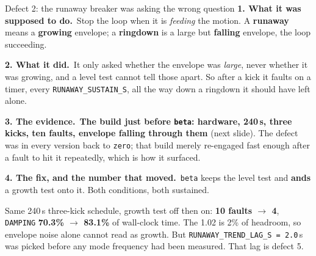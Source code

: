 \documentclass[aspectratio=169]{beamer}
\newcommand{\intended}{\textbf{1. What it was supposed to do.}}
\newcommand{\actual}{\textbf{2. What it did.}}
\newcommand{\evidence}{\textbf{3. The evidence.}}
\newcommand{\thefixn}{\textbf{4. The fix, and the number that moved.}}
\begin{document}
\begin{frame}{Defect 2: the runaway breaker was asking the wrong question}
  \footnotesize
  \intended\ Stop the loop when it is \emph{feeding} the motion. A
  \textbf{runaway} means a \textbf{growing} envelope; a \textbf{ringdown} is a
  large but \textbf{falling} envelope, the loop succeeding.

  \vspace{1mm}
  \actual\ It only asked whether the envelope was \emph{large}, never whether it
  was growing, and a level test cannot tell those apart. So after a kick it
  faults on a timer, every \texttt{RUNAWAY\_SUSTAIN\_S}, all the way down a
  ringdown it should have left alone.

  \vspace{1mm}
  \evidence\ \textbf{The build just before \texttt{beta}: hardware, 240\,s, three
  kicks, ten faults, envelope falling through them} (next slide). The defect was
  in every version back to \texttt{zero}; that build merely re-engaged fast enough
  after a fault to hit it repeatedly, which is how it surfaced.

  \vspace{1.5mm}
  \thefixn\ \texttt{beta} keeps the level test and \textbf{ands} a growth test
  onto it. Both conditions, both sustained.

  \vspace{1mm}
  \centering

  \vspace{1mm}
  \raggedright
  Same 240\,s three-kick schedule, growth test off then on: \textbf{10 faults
  $\to$ 4}, \texttt{DAMPING} \textbf{70.3\% $\to$ 83.1\%} of wall-clock time. The
  1.02 is 2\% of headroom, so envelope noise alone cannot read as growth. But
  \texttt{RUNAWAY\_TREND\_LAG\_S = 2.0}\,s was picked before any mode frequency
  had been measured. \alert{That lag is defect 5.}
\end{frame}
\end{document}
